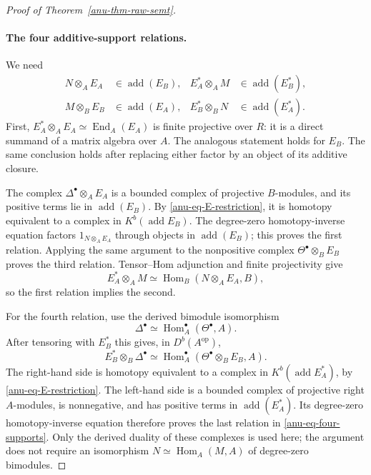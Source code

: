 \documentclass[12pt,a4paper,english,reqno]{amsart}
\numberwithin{equation}{section}
\theoremstyle{plain}
\theoremstyle{definition}
\begin{document}
\begin{proof}[Proof of Theorem~\ref{anu-thm-raw-semt}]
\paragraph{The four additive-support relations.}
We need
\begin{equation}\label{anu-eq-four-supports}
 \begin{aligned}
 N\otimes_AE_A&\in\operatorname{add}(E_B),&
 E_A^*\otimes_AM&\in\operatorname{add}(E_B^*),\\
 M\otimes_BE_B&\in\operatorname{add}(E_A),&
 E_B^*\otimes_BN&\in\operatorname{add}(E_A^*).
 \end{aligned}
\end{equation}
First, $E_A^*\otimes_AE_A\simeq\operatorname{End}_A(E_A)$
is finite projective over $R$: it is a direct summand of a matrix
algebra over $A$.  The analogous statement holds for $E_B$.
The same conclusion holds after replacing either factor by an
object of its additive closure.

The complex $\Delta^\bullet\otimes_AE_A$ is a bounded complex of
projective $B$-modules, and its positive terms lie in
$\operatorname{add}(E_B)$.  By \eqref{anu-eq-E-restriction}, it is
homotopy equivalent to a complex in
$K^b(\operatorname{add}E_B)$.
The degree-zero homotopy-inverse equation factors
$1_{N\otimes_AE_A}$ through objects in $\operatorname{add}(E_B)$;
this proves the first relation.  Applying the same argument to
the nonpositive complex $\Theta^\bullet\otimes_BE_B$ proves the
third relation.  Tensor--Hom adjunction and finite projectivity give
\[
 E_A^*\otimes_AM
 \simeq\operatorname{Hom}_B(N\otimes_AE_A,B),
\]
so the first relation implies the second.

For the fourth relation, use the derived bimodule isomorphism
\[
 \Delta^\bullet\simeq
 \operatorname{Hom}_A^\bullet(\Theta^\bullet,A).
\]
After tensoring with $E_B^*$ this gives, in $D^b(A^{\mathrm{op}})$,
\[
 E_B^*\otimes_B\Delta^\bullet
 \simeq
 \operatorname{Hom}_A^\bullet
       (\Theta^\bullet\otimes_BE_B,A).
\]
The right-hand side is homotopy equivalent to a complex in
$K^b(\operatorname{add}E_A^*)$, by
\eqref{anu-eq-E-restriction}.  The left-hand side is a bounded
complex of projective right $A$-modules, is nonnegative, and has
positive terms in $\operatorname{add}(E_A^*)$.
Its degree-zero homotopy-inverse equation therefore proves the
last relation in \eqref{anu-eq-four-supports}.
Only the derived duality of these complexes is used here; the
argument does not require an isomorphism
$N\simeq\operatorname{Hom}_A(M,A)$ of degree-zero bimodules.


\end{proof}
\end{document}
